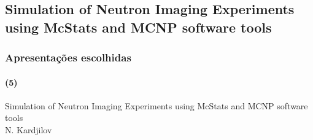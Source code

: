 \documentclass[svgnames,smaller,table]{beamer}
\begin{document}
\begin{frame}
  
\end{frame}
\begin{frame}
  
\end{frame}
\begin{frame}
  
\end{frame}
\begin{frame}
  
\end{frame}
\begin{frame}
  
\end{frame}
%  
\begin{frame}
  
\end{frame}
\begin{frame}
  
\end{frame}
%  
%  
%  
\begin{frame}
  
\end{frame}
%  
%  

\subsection{Simulation of Neutron Imaging Experiments using McStats and MCNP software tools}
\begin{frame}
  \frametitle{Apresentações escolhidas}
  \framesubtitle{(5)}
  \begin{center}
    Simulation of Neutron Imaging Experiments using McStats and MCNP software tools\\
    \vspace{2.0cm}
    N. Kardjilov
  \end{center}
\end{frame}
\end{document}
